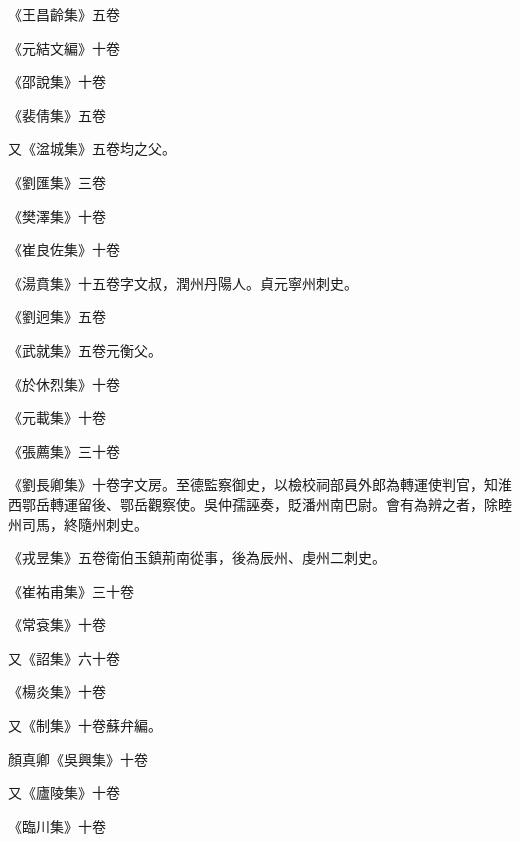 \begin{pinyinscope}
 《王昌齡集》五卷



 《元結文編》十卷



 《邵說集》十卷



 《裴倩集》五卷



 又《湓城集》五卷均之父。



 《劉匯集》三卷



 《樊澤集》十卷



 《崔良佐集》十卷



 《湯賁集》十五卷字文叔，潤州丹陽人。貞元寧州刺史。



 《劉迥集》五卷



 《武就集》五卷元衡父。



 《於休烈集》十卷



 《元載集》十卷



 《張薦集》三十卷



 《劉長卿集》十卷字文房。至德監察御史，以檢校祠部員外郎為轉運使判官，知淮西鄂岳轉運留後、鄂岳觀察使。吳仲孺誣奏，貶潘州南巴尉。會有為辨之者，除睦州司馬，終隨州刺史。



 《戎昱集》五卷衛伯玉鎮荊南從事，後為辰州、虔州二刺史。



 《崔祐甫集》三十卷



 《常袞集》十卷



 又《詔集》六十卷



 《楊炎集》十卷



 又《制集》十卷蘇弁編。



 顏真卿《吳興集》十卷



 又《廬陵集》十卷



 《臨川集》十卷




\end{pinyinscope}
